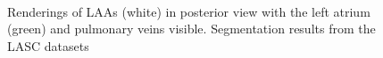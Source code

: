 \begin{figure}[t]
  \myfloatalign
   \quad
   \\
   \quad
  \caption[LAA examples]{Renderings of \acp{LAA} (white) in posterior view with the 
    left atrium (green) and pulmonary veins visible.  Segmentation results from the 
    LASC datasets \cite{tobon-gomez2015_BenchmarkAlgorithmsSegmenting}
  }
  \label{fig:bg_laa_outside}
\end{figure}



